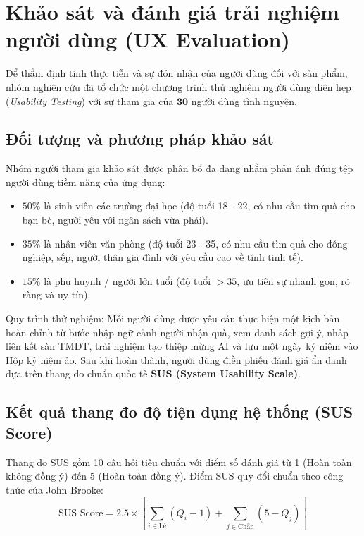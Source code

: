 \section{Khảo sát và đánh giá trải nghiệm người dùng (UX Evaluation)}

Để thẩm định tính thực tiễn và sự đón nhận của người dùng đối với sản phẩm, nhóm nghiên cứu đã tổ chức một chương trình thử nghiệm người dùng diện hẹp (\textit{Usability Testing}) với sự tham gia của $\mathbf{30}$ người dùng tình nguyện.

\subsection{Đối tượng và phương pháp khảo sát}
Nhóm người tham gia khảo sát được phân bổ đa dạng nhằm phản ánh đúng tệp người dùng tiềm năng của ứng dụng:
\begin{itemize}
    \item $50\%$ là sinh viên các trường đại học (độ tuổi 18 - 22, có nhu cầu tìm quà cho bạn bè, người yêu với ngân sách vừa phải).
    \item $35\%$ là nhân viên văn phòng (độ tuổi 23 - 35, có nhu cầu tìm quà cho đồng nghiệp, sếp, người thân gia đình với yêu cầu cao về tính tinh tế).
    \item $15\%$ là phụ huynh / người lớn tuổi (độ tuổi $>35$, ưu tiên sự nhanh gọn, rõ ràng và uy tín).
\end{itemize}

Quy trình thử nghiệm: Mỗi người dùng được yêu cầu thực hiện một kịch bản hoàn chỉnh từ bước nhập ngữ cảnh người nhận quà, xem danh sách gợi ý, nhấp liên kết sàn TMĐT, trải nghiệm tạo thiệp mừng AI và lưu một ngày kỷ niệm vào Hộp kỷ niệm ảo. Sau khi hoàn thành, người dùng điền phiếu đánh giá ẩn danh dựa trên thang đo chuẩn quốc tế \textbf{SUS (System Usability Scale)}.

\subsection{Kết quả thang đo độ tiện dụng hệ thống (SUS Score)}
Thang đo SUS gồm 10 câu hỏi tiêu chuẩn với điểm số đánh giá từ 1 (Hoàn toàn không đồng ý) đến 5 (Hoàn toàn đồng ý). Điểm SUS quy đổi chuẩn theo công thức của John Brooke:
\begin{equation}
    \text{SUS Score} = 2.5 \times \left[ \sum_{i \in \text{Lẻ}} (Q_i - 1) + \sum_{j \in \text{Chẵn}} (5 - Q_j) \right]
\end{equation}

